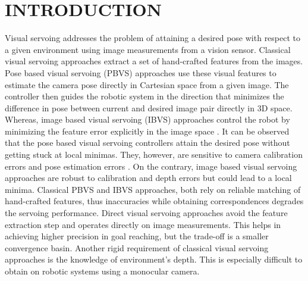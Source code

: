 \documentclass[letterpaper, 10 pt, conference]{ieeeconf}  %
\begin{document}
\section{INTRODUCTION}
Visual servoing addresses the problem of attaining a desired pose with respect to a given environment using image measurements from a vision sensor. Classical visual servoing approaches extract a set of hand-crafted features from the images. Pose based visual servoing (PBVS) approaches use these visual features to estimate the camera pose directly in Cartesian space from a given image. The controller then guides the robotic system in the direction that minimizes the difference in pose between current and desired image pair directly in 3D space. Whereas, image based visual servoing (IBVS) approaches control the robot by minimizing the feature error explicitly in the image space \cite{vsbasic}. It can be observed that the pose based visual servoing controllers attain the desired pose without getting stuck at local minimas. They, however, are sensitive to camera calibration errors and pose estimation errors \cite{vsprob}. On the contrary, image based visual servoing approaches are robust to calibration and depth errors but could lead to a local minima. Classical PBVS and IBVS approaches, both rely on reliable matching of hand-crafted features, thus inaccuracies while obtaining correspondences degrades the servoing performance. Direct visual servoing \cite{photometricvs} approaches avoid the feature extraction step and operates directly on image measurements. This helps in achieving higher precision in goal reaching, but the trade-off is a smaller convergence basin. Another rigid requirement of classical visual servoing approaches is the knowledge of environment's depth. This is especially difficult to obtain on robotic systems using a monocular camera.
\end{document}
